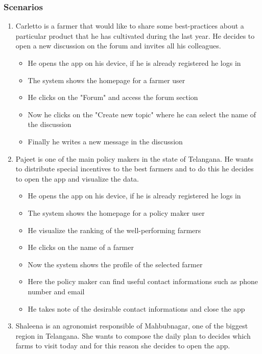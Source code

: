 \documentclass[table, 12pt]{article}
\begin{document}
\subsubsection{Scenarios}
\begin{enumerate}
    \item Carletto is a farmer that would like to share some best-practices about a particular product that he has cultivated during the last year.
    He decides to open a new discussion on the forum and invites all his colleagues.
    \begin{itemize}
        \item He opens the app on his device, if he is already registered he logs in
        \item The system shows the homepage for a farmer user
        \item He clicks on the "Forum" and access the forum section
        \item Now he clicks on the "Create new topic" where he can select the name of the discussion
        \item Finally he writes a new message in the discussion
    \end{itemize}
    \item Pajeet is one of the main policy makers in the state of Telangana.
    He wants to distribute special incentives to the best farmers and to do this he decides
    to open the app and visualize the data.
    \begin{itemize}
        \item He opens the app on his device, if he is already registered he logs in
        \item The system shows the homepage for a policy maker user
        \item He visualize the ranking of the well-performing farmers
        \item He clicks on the name of a farmer
        \item Now the system shows the profile of the selected farmer
        \item Here the policy maker can find useful contact informations such as phone number and email
        \item He takes note of the desirable contact informations and close the app
    \end{itemize}
    \item Shaleena is an agronomist responsible of Mahbubnagar, one of the biggest region in Telangana.
    She wants to compose the daily plan to decides which farms to visit today and for this reason she decides to open the app.

\end{enumerate}
\end{document}
